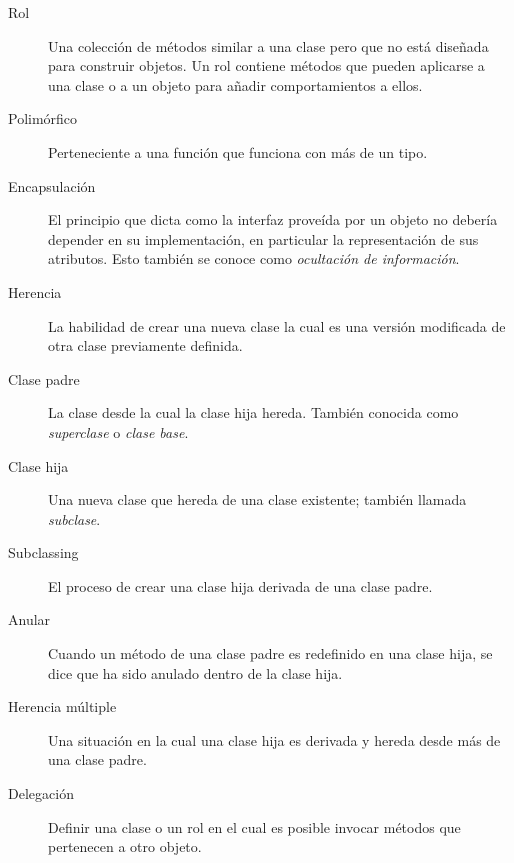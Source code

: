 \begin{description}
\item[Rol] Una colección de métodos similar a una clase pero
que no está diseñada para construir objetos. Un rol contiene 
métodos que pueden aplicarse a una clase o a un objeto para
añadir comportamientos a ellos.

\item[Polimórfico] Perteneciente a una función que funciona con
más de un tipo.  

\item[Encapsulación] El principio que dicta como la interfaz proveída por un objeto
no debería depender en su implementación, en particular 
la representación de sus atributos. Esto también se conoce como
\emph{ocultación de información}.

\item[Herencia] La habilidad de crear una nueva clase la cual
es una versión modificada de otra clase previamente definida.

\item[Clase padre] La clase desde la cual la clase hija 
hereda. También conocida como \emph{superclase} o \emph{clase base}.

\item[Clase hija] Una nueva clase que hereda de una clase existente;
también llamada \emph{subclase}.

\item[Subclassing] El proceso de crear una clase hija derivada
de una clase padre.

\item[Anular] Cuando un método de una clase padre 
es redefinido en una clase hija, se dice que ha sido 
anulado dentro de la clase hija.

\item[Herencia múltiple] Una situación en la cual una clase hija
es derivada y hereda desde más de una clase padre.

\item[Delegación] Definir una clase o un rol en el cual 
es posible invocar métodos que pertenecen a otro objeto.

\end{description}

